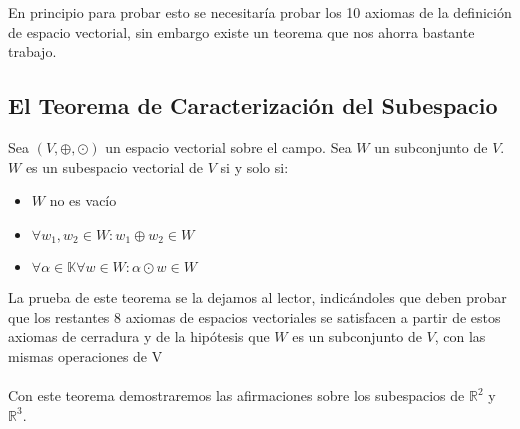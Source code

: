 En principio para probar esto se necesitaría probar los 10 axiomas de la definición de espacio vectorial, sin embargo existe un teorema que nos ahorra bastante trabajo.


\newpage
\subsection{El Teorema de Caracterización del Subespacio}

\begin{theorem}
Sea $\left(V, \oplus, \odot\right)$ un espacio vectorial sobre el campo. Sea $W$ un subconjunto de $V$. $W$ es un subespacio vectorial de $V$ si y solo si:
	
	\begin{itemize}
	\item $W$ no es vac\'io
	\item $\forall w_1, w_2 \in W: w_1\oplus w_2 \in W$
	\item $\forall \alpha \in \mathbb{K} \forall w \in W: \alpha \odot w \in W$
	
	\end{itemize}

\end{theorem}

La prueba de este teorema se la dejamos al lector, indic\'andoles que deben probar que los restantes 8 axiomas de espacios vectoriales se satisfacen a partir de estos axiomas de cerradura y de la hip\'otesis que $W$ es un subconjunto de $V$, con las mismas operaciones de V
\\
\\
Con este teorema demostraremos las afirmaciones sobre los subespacios de $\mathbb{R}^2$ y 
$\mathbb{R}^3$.

